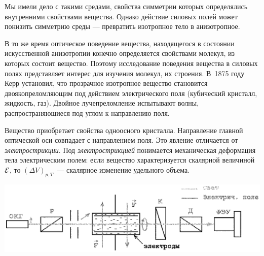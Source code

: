 ﻿
\thispagestyle{empty}

Мы имели дело с такими средами, свойства симметрии которых
определялись внутренними свойствами вещества. Однако действие
силовых полей может понизить симметрию среды --- превратить
изотропное тело в анизотропное.\par
В то же время оптическое поведение вещества, находящегося в
состоянии искусственной анизотропии конечно определяется
свойствами молекул, из которых состоит вещество. Поэтому
исследование поведения вещества в силовых полях представляет
интерес для изучения молекул, их строения. В~1875 году Керр
установил, что прозрачное изотропное вещество становится
двоякопреломляющим под действием электрического поля (кубический
кристалл, жидкость, газ).
Двойное лучепреломление испытывают волны, распространяющиеся под
углом к направлению поля.\par
Вещество приобретает свойства одноосного кристалла. Направление
главной оптической оси совпадает с направлением поля. Это явление
отличается от {\it электрострикции}. Под {\it электрострикцией} понимается
механическая деформация тела электрическим полем: если вещество
характеризуется скалярной величиной $\cal E$, то $(\Delta V)_{p,T}$~---
скалярное изменение удельного объема.
\vskip -4mm
\centerline{\hbox{\includegraphics[scale=0.69]{Ris/ris_eps/eff_kerr/ris1.eps}}}

